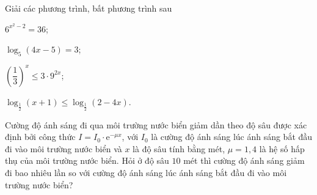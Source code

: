 \begin{bt}%
	Giải các phương trình, bất phương trình sau
	\begin{listEX}[2]
		\item $6^{x^2-2}=36$;
		\item $\log_5 \left(4x-5\right)=3$; 
		\item $\left(\dfrac{1}{3} \right)^x \le 3\cdot 9^{2x}$;
		\item  $\log _{\tfrac{1}{2}} \left(x+1\right)\le \log _{\tfrac{1}{2}} \left(2-4x\right)$.
	\end{listEX}
\end{bt}

\begin{bt}%
	Cường độ ánh sáng đi qua môi trường nước biển giảm dần theo độ sâu được xác định bởi công thức $I=I_0\cdot \mathrm{e}^{-\mu x}$, với $I_0$ là cường độ ánh sáng lúc ánh sáng bắt đầu đi vào môi trường nước biển và $x$ là độ sâu tính bằng mét, $\mu=1{,}4$ là hệ số hấp thụ của môi trường nước biển. Hỏi ở độ sâu $10$ mét thì cường độ ánh sáng giảm đi bao nhiêu lần so với cường độ ánh sáng lúc ánh sáng bắt đầu đi vào môi trường nước biển?
\end{bt}

